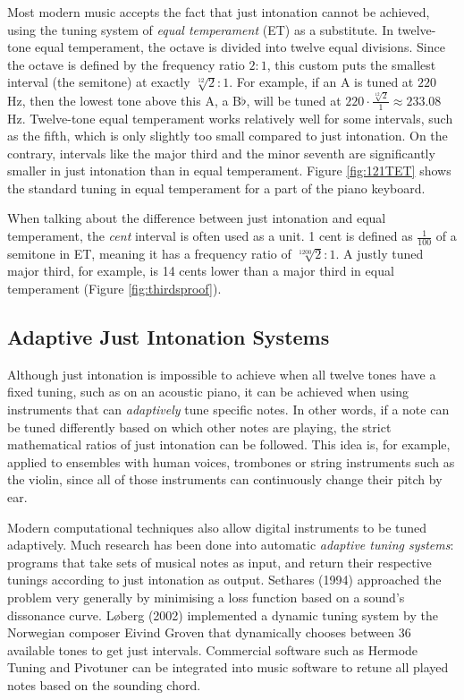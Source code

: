 \documentclass[a4paper]{article}
\begin{document}
Most modern music accepts the fact that just intonation cannot be achieved, using the tuning system of \textit{equal temperament} (ET) as a substitute. In twelve-tone equal temperament, the octave is divided into twelve equal divisions. Since the octave is defined by the frequency ratio $2:1$, this custom puts the smallest interval (the semitone) at exactly $\sqrt[12]{2}:1$. For example, if an A is tuned at $220$ Hz, then the lowest tone above this A, a B$\flat$, will be tuned at $220\cdot \frac{\sqrt[12]{2}}{1} \approx 233.08$ Hz.\cite{van_de_craats_fis_1989} Twelve-tone equal temperament works relatively well for some intervals, such as the fifth, which is only slightly too small compared to just intonation. On the contrary, intervals like the major third and the minor seventh are significantly smaller in just intonation than in equal temperament. Figure \ref{fig:121TET} shows the standard tuning in equal temperament for a part of the piano keyboard. 

When talking about the difference between just intonation and equal temperament, the \textit{cent} interval is often used as a unit. 1 cent is defined as $\frac{1}{100}$ of a semitone in ET, meaning it has a frequency ratio of $\sqrt[1200]{2}:1$. A justly tuned major third, for example, is 14 cents lower than a major third in equal temperament (Figure \ref{fig:thirdsproof}).

\subsection{Adaptive Just Intonation Systems}
\label{intro_adaptive_ji}

Although just intonation is impossible to achieve when all twelve tones have a fixed tuning, such as on an acoustic piano, it can be achieved when using instruments that can \textit{adaptively} tune specific notes. In other words, if a note can be tuned differently based on which other notes are playing, the strict mathematical ratios of just intonation can be followed. This idea is, for example, applied to ensembles with human voices, trombones or string instruments such as the violin, since all of those instruments can continuously change their pitch by ear.\cite{van_de_craats_fis_1989}

Modern computational techniques also allow digital instruments to be tuned adaptively. Much research has been done into automatic \textit{adaptive tuning systems}: programs that take sets of musical notes as input, and return their respective tunings according to just intonation as output. Sethares (1994) approached the problem very generally by minimising a loss function based on a sound's dissonance curve.\cite{sethares_adaptive_1994} Løberg (2002) implemented a dynamic tuning system by the Norwegian composer Eivind Groven that dynamically chooses between 36 available tones to get just intervals.\cite{code_grovenmax_2002} Commercial software such as Hermode Tuning\cite{mohrlok_hermode_2003} and Pivotuner\cite{noauthor_pivotuner_nodate} can be integrated into music software to retune all played notes based on the sounding chord.
\end{document}
